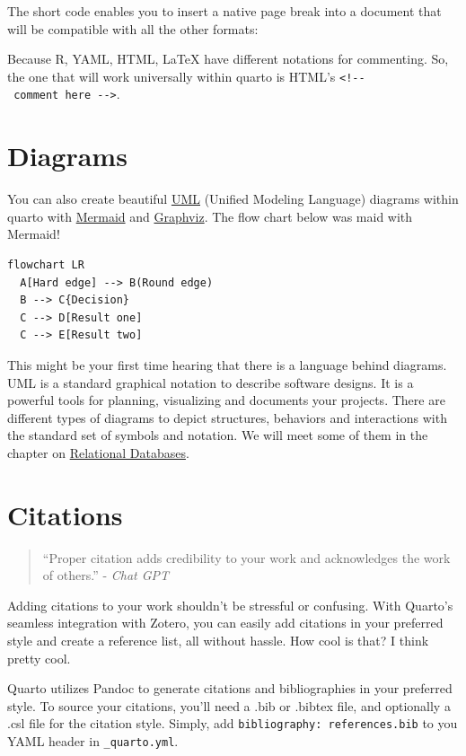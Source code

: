 \documentclass[
  letterpaper,
]{book}
\begin{document}
The \texttt{} short code enables you to insert a native page break into
a document that will be compatible with all the other formats:

Because R, YAML, HTML, LaTeX have different notations for commenting.
So, the one that will work universally within quarto is HTML's
\texttt{\textless{}!-\/-\ comment\ here\ -\/-\textgreater{}}.

\hypertarget{diagrams}{%
\section{Diagrams}\label{diagrams}}

You can also create beautiful \href{https://www.uml.org/}{UML} (Unified
Modeling Language) diagrams within quarto with
\href{https://mermaid.js.org/}{Mermaid} and
\href{https://graphviz.org/}{Graphviz}. The flow chart below was maid
with Mermaid!

\begin{verbatim}
flowchart LR
  A[Hard edge] --> B(Round edge)
  B --> C{Decision}
  C --> D[Result one]
  C --> E[Result two]
\end{verbatim}

This might be your first time hearing that there is a language behind
diagrams. UML is a standard graphical notation to describe software
designs. It is a powerful tools for planning, visualizing and documents
your projects. There are different types of diagrams to depict
structures, behaviors and interactions with the standard set of symbols
and notation. We will meet some of them in the chapter on
\protect\hyperlink{relational-databases}{Relational Databases}.

\hypertarget{citations}{%
\section{Citations}\label{citations}}

\begin{quote}
``Proper citation adds credibility to your work and acknowledges the
work of others.'' - \emph{Chat GPT}
\end{quote}

Adding citations to your work shouldn't be stressful or confusing. With
Quarto's seamless integration with Zotero, you can easily add citations
in your preferred style and create a reference list, all without hassle.
How cool is that? I think pretty cool.

Quarto utilizes Pandoc to generate citations and bibliographies in your
preferred style. To source your citations, you'll need a .bib or .bibtex
file, and optionally a .csl file for the citation style. Simply, add
\texttt{bibliography:\ references.bib} to you YAML header in
\texttt{\_quarto.yml}.
\end{document}
